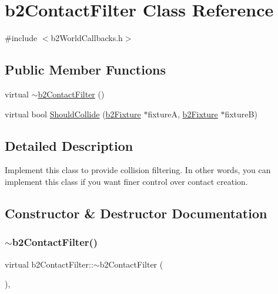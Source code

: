 \hypertarget{classb2_contact_filter}{}\section{b2\+Contact\+Filter Class Reference}
\label{classb2_contact_filter}


{\ttfamily \#include $<$b2\+World\+Callbacks.\+h$>$}

\subsection*{Public Member Functions}
\begin{DoxyCompactItemize}
\item 
virtual \mbox{\hyperlink{classb2_contact_filter_a1a6f1ad4208624b180e4536ff4bc1d9c}{$\sim$b2\+Contact\+Filter}} ()
\item 
virtual bool \mbox{\hyperlink{classb2_contact_filter_aac8f6155d1f577d125db587f5269289b}{Should\+Collide}} (\mbox{\hyperlink{classb2_fixture}{b2\+Fixture}} $\ast$fixtureA, \mbox{\hyperlink{classb2_fixture}{b2\+Fixture}} $\ast$fixtureB)
\end{DoxyCompactItemize}


\subsection{Detailed Description}
Implement this class to provide collision filtering. In other words, you can implement this class if you want finer control over contact creation. 

\subsection{Constructor \& Destructor Documentation}
\mbox{\label{classb2_contact_filter_a1a6f1ad4208624b180e4536ff4bc1d9c}} 
\subsubsection{\texorpdfstring{$\sim$b2ContactFilter()}{~b2ContactFilter()}}
{\footnotesize\ttfamily virtual b2\+Contact\+Filter\+::$\sim$b2\+Contact\+Filter (\begin{DoxyParamCaption}{ }\end{DoxyParamCaption})\hspace{0.3cm}{\ttfamily [inline]}, {\ttfamily [virtual]}}



